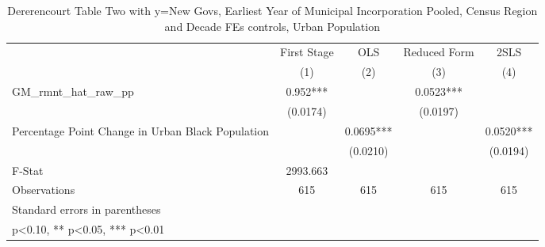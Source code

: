 \begin{table}[htbp]\centering
\def\sym#1{\ifmmode^{#1}\else\(^{#1}\)\fi}
\caption{Dererencourt Table Two with y=New Govs, Earliest Year of Municipal Incorporation  Pooled, Census Region and Decade FEs controls, Urban Population}
\begin{tabular}{l*{4}{c}}
\toprule
                    & First Stage   &         OLS   &Reduced Form   &        2SLS   \\
                    &\multicolumn{1}{c}{(1)}   &\multicolumn{1}{c}{(2)}   &\multicolumn{1}{c}{(3)}   &\multicolumn{1}{c}{(4)}   \\
\midrule
GM\_rmnt\_hat\_raw\_pp  &       0.952***&               &      0.0523***&               \\
                    &    (0.0174)   &               &    (0.0197)   &               \\
\addlinespace
Percentage Point Change in Urban Black Population&               &      0.0695***&               &      0.0520***\\
                    &               &    (0.0210)   &               &    (0.0194)   \\
\midrule
F-Stat              &    2993.663   &               &               &               \\
Observations        &         615   &         615   &         615   &         615   \\
\bottomrule
\multicolumn{5}{l}{\footnotesize Standard errors in parentheses}\\
\multicolumn{5}{l}{\footnotesize * p<0.10, ** p<0.05, *** p<0.01}\\
\end{tabular}
\end{table}
